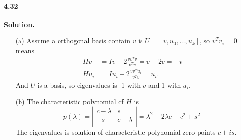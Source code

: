 \documentclass[a4paper]{book}
\newenvironment{solution}%
{\noindent\textbf{Solution.}}%
{\qedhere}
\numberwithin{equation}{chapter}
\theoremstyle{definition}
\begin{document}
\paragraph*{4.32 }
\begin{solution}
    \begin{itemize}
        \item [(a)] Assume a orthogonal basis contain $v$ is 
        $U = [v, u_0, \ldots, u_k]$, so $v^Tu_i = 0$ means 
        \begin{align*}
            Hv &= Iv - 2 \frac{v v^T v}{v^T v} = v - 2v = -v \\
            Hu_i&= Iu_i - 2 \frac{v v^T u_i}{v^T v} = u_i.
        \end{align*}
        And $U$ is a basis, so eigenvalues is -1 with $v$ and 1 with $u_i$.

        \item [(b)] The characteristic polynomial of $H$ is 
        \[p(\lambda) =\left| \begin{array}{cc}
            c - \lambda & s \\
            -s & c - \lambda \\
        \end{array} \right| = \lambda^2 - 2\lambda c +c^2 +s^2. \]
        The eigenvalues is solution of characteristic polynomial zero points 
        $c \pm is$.
    \end{itemize}
\end{solution}
\end{document}
